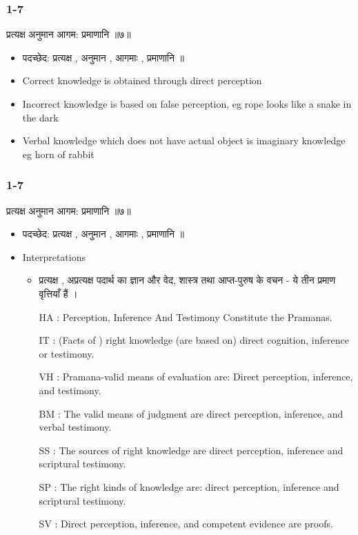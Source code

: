 \begin{frame}[fragile]\frametitle{1-7}

\begin{sanskrit}
प्रत्यक्ष अनुमान आगम: प्रमाणानि ॥७॥
\end{sanskrit}


	\begin{itemize}
	\item पदच्छेद: प्रत्यक्ष , अनुमान , आगमाः , प्रमाणानि ॥
	\item Correct knowledge is obtained through direct perception
	\item Incorrect knowledge is based on false perception, eg rope looks like a snake in the dark
	\item Verbal knowledge which does not have actual object is imaginary knowledge eg horn of rabbit
	\end{itemize}

\end{frame}


\begin{frame}[fragile]\frametitle{1-7}

\begin{sanskrit}
प्रत्यक्ष अनुमान आगम: प्रमाणानि ॥७॥
\end{sanskrit}


	\begin{itemize}
	\item पदच्छेद: प्रत्यक्ष , अनुमान , आगमाः , प्रमाणानि ॥
	\item Interpretations
		\begin{itemize}		
		\item प्रत्यक्ष , अप्रत्यक्ष पदार्थ का ज्ञान और वेद, शास्त्र तथा आप्त-पुरुष के वचन - ये तीन प्रमाण वृत्तियाँ हैं ।
		\item [HA]: Perception, Inference And Testimony Constitute the Pramanas.
		\item [IT]: (Facts of ) right knowledge (are based on) direct cognition, inference or testimony.
		\item [VH]: Pramana-valid means of evaluation are: Direct perception, inference, and testimony.
		\item [BM]: The valid means of judgment are direct perception, inference, and verbal testimony.
		\item [SS]: The sources of right knowledge are direct perception, inference and scriptural testimony.
		\item [SP]: The right kinds of knowledge are: direct perception, inference and scriptural testimony.
		\item [SV]: Direct perception, inference, and competent evidence are proofs.
		\end{itemize}
	\end{itemize}

\end{frame}

